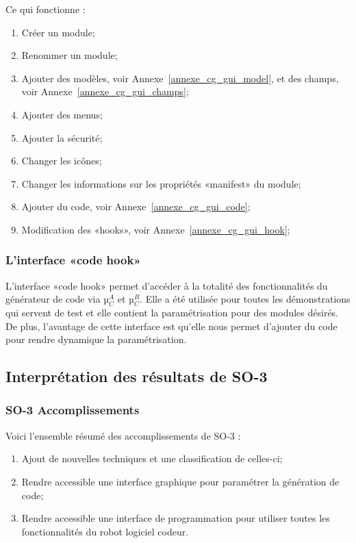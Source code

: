 Ce qui fonctionne : 
\begin{enumerate}
    \item Créer un module;
    \item Renommer un module;
    \item Ajouter des modèles, voir Annexe~\ref{annexe_cg_gui_model}, et des champs, voir Annexe~\ref{annexe_cg_gui_champs};
    \item Ajouter des menus;
    \item Ajouter la sécurité;
    \item Changer les icônes;
    \item Changer les informations sur les propriétés «manifest» du module;
    \item Ajouter du code, voir Annexe~\ref{annexe_cg_gui_code};
    \item Modification des «hooks», voir Annexe~\ref{annexe_cg_gui_hook};
\end{enumerate}

\subsubsection{L'interface «code hook»}


L'interface «code hook» permet d’accéder à la totalité des fonctionnalités du générateur de code via µ$_C^A$ et µ$_C^B$. Elle a été utilisée pour toutes les démonstrations qui servent de test et elle contient la paramétrisation pour des modules désirés. De plus, l'avantage de cette interface est qu'elle nous permet d'ajouter du code pour rendre dynamique la paramétrisation.

\subsection{Interprétation des résultats de SO-3}

\subsubsection{SO-3 Accomplissements}
Voici l'ensemble résumé des accomplissements de SO-3 :
\begin{enumerate}
    \item Ajout de nouvelles techniques et une classification de celles-ci;
    \item Rendre accessible une interface graphique pour paramétrer la génération de code;
    \item Rendre accessible une interface de programmation pour utiliser toutes les fonctionnalités du robot logiciel codeur.
\end{enumerate}

